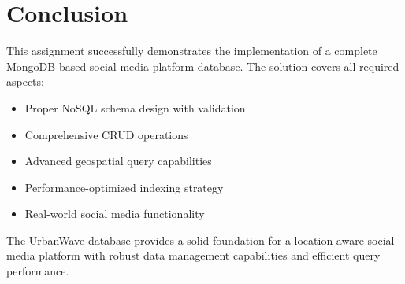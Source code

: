 \documentclass[12pt,a4paper]{article}
\begin{document}
\section{Conclusion}
This assignment successfully demonstrates the implementation of a complete MongoDB-based social media platform database. The solution covers all required aspects:

\begin{itemize}
    \item Proper NoSQL schema design with validation
    \item Comprehensive CRUD operations
    \item Advanced geospatial query capabilities
    \item Performance-optimized indexing strategy
    \item Real-world social media functionality
\end{itemize}

The UrbanWave database provides a solid foundation for a location-aware social media platform with robust data management capabilities and efficient query performance.
\end{document}
